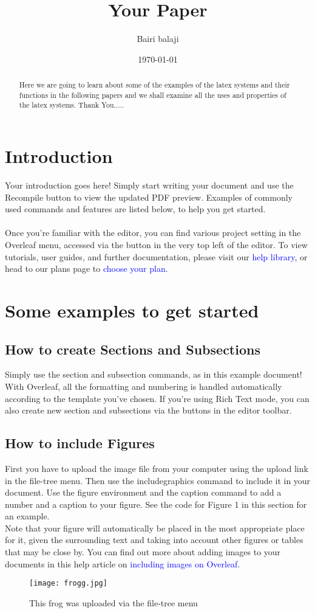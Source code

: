 \documentclass{article}
\title{Your Paper}
\author{Bairi balaji}
\date{\today}
\begin{document}
\maketitle
\begin{abstract}
	Here we are going to learn about some of the examples of the latex systems and their functions in the following papers and we shall examine all the uses and properties of the latex systems.
       \newline
	    Thank You.....
\end{abstract}
\section{Introduction}
Your introduction goes here! Simply start writing your document and use the Recompile button to
view the updated PDF preview. Examples of commonly used commands and features are listed below,
to help you get started.\\
\\Once you’re familiar with the editor, you can find various project setting in the Overleaf menu,
accessed via the button in the very top left of the editor. To view tutorials, user guides, and further
documentation, please visit our \textcolor{blue}{help library}, or head to our plans page to \textcolor{blue}{choose your plan}.
\section{Some examples to get started}
\subsection{How to create Sections and Subsections}
Simply use the section and subsection commands, as in this example document! With Overleaf, all
the formatting and numbering is handled automatically according to the template you’ve chosen. If
you’re using Rich Text mode, you can also create new section and subsections via the buttons in the
editor toolbar.
\subsection{How to include Figures}
First you have to upload the image file from your computer using the upload link in the file-tree menu.
Then use the includegraphics command to include it in your document. Use the figure environment
and the caption command to add a number and a caption to your figure. See the code for Figure 1 in
this section for an example.\\
Note that your figure will automatically be placed in the most appropriate place for it, given the
surrounding text and taking into account other figures or tables that may be close by. You can find
out more about adding images to your documents in this help article on \textcolor{blue}{including images on Overleaf}.
\begin{figure}
	\centering
	\texttt{[image: frogg.jpg]}
	\caption{This frog was uploaded via the file-tree menu}\label{figure 1:This frog was uploaded via the file-tree menu}
\end{figure}
\end{document}
